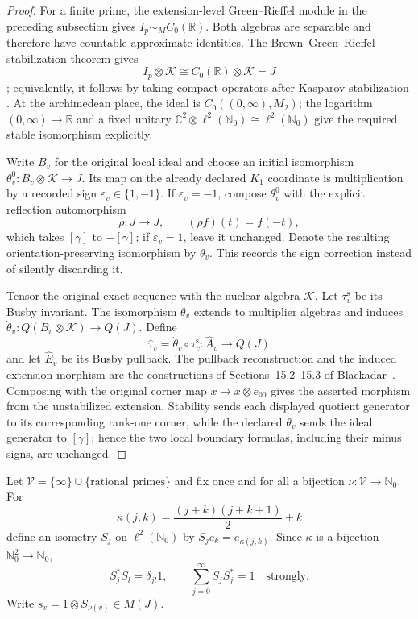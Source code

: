 \begin{proof}
For a finite prime, the extension-level Green--Rieffel module in the preceding
subsection gives $I_p\sim_M C_0(\mathbb R)$.  Both algebras are separable and
therefore have countable approximate identities.  The Brown--Green--Rieffel
stabilization theorem gives
\[
 I_p\otimes\mathcal K\cong C_0(\mathbb R)\otimes\mathcal K=J
\]
\cite[Theorems~1.1--1.2, pp.~349--352]{brownGreenRieffel1977}; equivalently,
it follows by taking compact operators after Kasparov stabilization
\cite[Theorem~13.6.2 and Exercise~13.7.1, pp.~131--132]{blackadar1986}.
At the archimedean place, the ideal is
$C_0((0,\infty),M_2)$; the logarithm $(0,\infty)\to\mathbb R$ and a fixed
unitary $\mathbb C^2\otimes\ell^2(\mathbb N_0)\cong
\ell^2(\mathbb N_0)$ give the required stable isomorphism explicitly.

Write $B_v$ for the original local ideal and choose an initial isomorphism
$\theta_v^0:B_v\otimes\mathcal K\to J$.  Its map on the already declared
$K_1$ coordinate is multiplication by a recorded sign
$\varepsilon_v\in\{1,-1\}$.  If $\varepsilon_v=-1$, compose $\theta_v^0$
with the explicit reflection automorphism
\[
 \rho:J\longrightarrow J,\qquad (\rho f)(t)=f(-t),
\]
which takes $[\gamma]$ to $-[\gamma]$; if $\varepsilon_v=1$, leave it
unchanged.  Denote the resulting orientation-preserving isomorphism by
$\theta_v$.  This records the sign correction instead of silently discarding
it.

Tensor the original exact sequence with the nuclear algebra $\mathcal K$.
Let $\tau_v^{\mathrm s}$ be its Busby invariant.  The isomorphism $\theta_v$
extends to multiplier algebras and induces
$\dot\theta_v:Q(B_v\otimes\mathcal K)\to Q(J)$.  Define
\[
 \widehat\tau_v=\dot\theta_v\circ\tau_v^{\mathrm s}
 :\widehat A_v\longrightarrow Q(J)
\]
and let $\widehat E_v$ be its Busby pullback.  The pullback reconstruction and
the induced extension morphism are the constructions of
Sections~15.2--15.3 of Blackadar~\cite[pp.~144--145]{blackadar1986}.  Composing
with the original corner map $x\mapsto x\otimes e_{00}$ gives the asserted
morphism from the unstabilized extension.  Stability sends each displayed
quotient generator to its corresponding rank-one corner, while the declared
$\theta_v$ sends the ideal generator to $[\gamma]$; hence the two local
boundary formulas, including their minus signs, are unchanged.
\end{proof}

Let $\mathcal V=\{\infty\}\cup\{\text{rational primes}\}$ and fix once and for
all a bijection $\nu:\mathcal V\to\mathbb N_0$.  For
\[
 \kappa(j,k)=\frac{(j+k)(j+k+1)}2+k
\]
define an isometry $S_j$ on $\ell^2(\mathbb N_0)$ by
$S_je_k=e_{\kappa(j,k)}$.  Since $\kappa$ is a bijection
$\mathbb N_0^2\to\mathbb N_0$,
\begin{equation}
 S_j^*S_l=\delta_{jl}1,
 \qquad
 \sum_{j=0}^{\infty}S_jS_j^*=1
 \quad\text{strongly}.
 \label{eq:global-place-cuntz-family}
\end{equation}
Write $s_v=1\otimes S_{\nu(v)}\in M(J)$.

